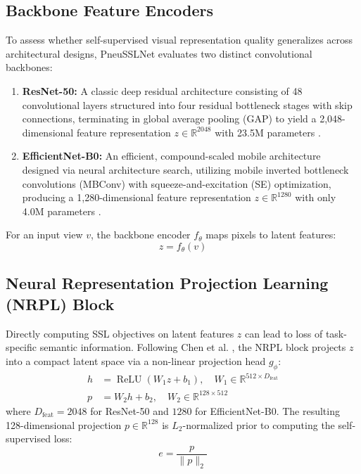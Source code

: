 \documentclass[journal,article,submit,moreauthors,pdftex]{Definitions/tsp}
\begin{document}
\subsection{Backbone Feature Encoders} \label{sect:s3dot2}
To assess whether self-supervised visual representation quality generalizes across architectural designs, PneuSSLNet evaluates two distinct convolutional backbones:
\begin{enumerate}
    \item \textbf{ResNet-50:} A classic deep residual architecture consisting of 48 convolutional layers structured into four residual bottleneck stages with skip connections, terminating in global average pooling (GAP) to yield a 2,048-dimensional feature representation $z \in \mathbb{R}^{2048}$ with 23.5M parameters \cite{He16}.
    \item \textbf{EfficientNet-B0:} An efficient, compound-scaled mobile architecture designed via neural architecture search, utilizing mobile inverted bottleneck convolutions (MBConv) with squeeze-and-excitation (SE) optimization, producing a 1,280-dimensional feature representation $z \in \mathbb{R}^{1280}$ with only 4.0M parameters \cite{Tan19}.
\end{enumerate}
For an input view $v$, the backbone encoder $f_\theta$ maps pixels to latent features:
\begin{equation}
z = f_\theta(v)
\end{equation}

\subsection{Neural Representation Projection Learning (NRPL) Block} \label{sect:s3dot3}
Directly computing SSL objectives on latent features $z$ can lead to loss of task-specific semantic information. Following Chen et al. \cite{Chen20}, the NRPL block projects $z$ into a compact latent space via a non-linear projection head $g_\phi$:
\begin{align}
h &= \operatorname{ReLU}(W_1 z + b_1), \quad W_1 \in \mathbb{R}^{512 \times D_{\text{feat}}} \\
p &= W_2 h + b_2, \quad W_2 \in \mathbb{R}^{128 \times 512}
\end{align}
where $D_{\text{feat}} = 2048$ for ResNet-50 and $1280$ for EfficientNet-B0. The resulting 128-dimensional projection $p \in \mathbb{R}^{128}$ is $L_2$-normalized prior to computing the self-supervised loss:
\begin{equation}
e = \frac{p}{\|p\|_2}
\end{equation}
\end{document}
